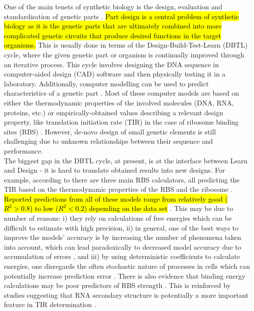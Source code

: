 \documentclass{article}
\begin{document}
One of the main tenets of synthetic biology is the design, evaluation and standardisation of genetic parts \cite{Brophy2014,Canton2008,Stanton2014}.
\hl{Part design is a central problem of synthetic biology as it is the genetic parts that are ultimately combined into more complicated genetic circuits that produce desired functions in the target organisms.}
This is usually done in terms of the Design-Build-Test-Learn (DBTL) cycle, where the given genetic part or organism is continually improved through an iterative process.
This cycle involves designing the DNA sequence in computer-aided design (CAD) software and then physically testing it in a laboratory.
Additionally, computer modelling can be used to predict characteristics of a genetic part \cite{Yeoh2019,Nielsen2016}.
Most of these computer models are based on either the thermodynamic properties of the involved molecules (DNA, RNA, proteins, etc.) or empirically-obtained values describing a relevant design property, like translation initiation rate (TIR) in the case of ribosome binding sites (RBS) \cite{Xia1998,Chen2013,Reeve2014}.
However, de-novo design of small genetic elements is still challenging due to unknown relationships between their sequence and performance.\\

The biggest gap in the DBTL cycle, at present, is at the interface between Learn and Design - it is hard to translate obtained results into new designs.
For example, according to  \textcite{Reeve2014} there are three main RBS calculators, all predicting the TIR based on the thermodynamic properties of the RBS and the ribosome \cite{Seo2013,Na2010,Salis2009}.
\hl{Reported predictions from all of these models range from relatively good ($R^2 >0.8$) to low ($R^2 <0.2$) depending on the data set } \cite{Reis2020}.
This may be due to number of reasons: i) they rely on calculations of free energies which can be difficult to estimate with high precision, ii) in general, one of the best ways to improve the models' accuracy is by increasing the number of phenomena taken into account, which can lead paradoxically to decreased model accuracy due to accumulation of errors \cite{EspahBorujeni2016}, and iii) by using deterministic coefficients to calculate energies, one disregards the often stochastic nature of processes in cells which can potentially increase prediction error \cite{Goss1998}.
There is also evidence that binding energy calculations may be poor predictors of RBS strength \cite{Saito2020,Sherer1980}.
This is reinforced by studies suggesting that RNA secondary structure is potentially a more important feature in TIR determination \cite{DESMIT1994,EspahBorujeni2016}.\\
\end{document}
